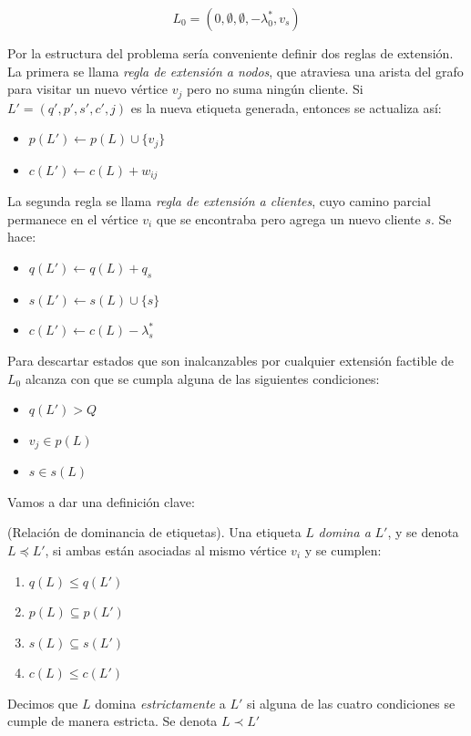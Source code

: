 \begin{equation}
    L_0 = (0, \emptyset, \emptyset, -\lambda^{*}_0, v_s)
\end{equation}

Por la estructura del problema sería conveniente definir dos reglas de extensión. La primera se llama \emph{regla de extensión a nodos}, que atraviesa una arista del grafo para visitar un nuevo vértice $v_j$ pero no suma ningún cliente. Si $L' = (q', p', s', c', j)$ es la nueva etiqueta generada, entonces se actualiza así:

\begin{itemize}
    \item $p(L') \gets p(L) \cup \{v_j\}$
    \item $c(L') \gets c(L) + w_{ij}$
\end{itemize}

La segunda regla se llama \emph{regla de extensión a clientes}, cuyo camino parcial permanece en el vértice $v_i$ que se encontraba pero agrega un nuevo cliente $s$. Se hace:

\begin{itemize}
    \item $q(L') \gets q(L) + q_ s$
    \item $s(L') \gets s(L) \cup \{s\}$
    \item $c(L') \gets c(L) - \lambda^{*}_s$
\end{itemize}

Para descartar estados que son inalcanzables por cualquier extensión factible de $L_0$ alcanza con que se cumpla alguna de las siguientes condiciones:

\begin{itemize}
    \item $q(L') > Q$
    \item $v_j \in p(L)$
    \item $s \in s(L)$
\end{itemize}

Vamos a dar una definición clave:

\begin{definition}
\label{def:domination}
    (Relación de dominancia de etiquetas).
    Una etiqueta $L$ \emph{domina a} $L'$, y se denota $L \preceq L'$, si ambas están asociadas al mismo vértice $v_i$ y se cumplen:
    \begin{enumerate}
        \item $q(L) \leq q(L')$
        \item $p(L) \subseteq p(L')$
        \item $s(L) \subseteq s(L')$
        \item $c(L) \leq c(L')$
    \end{enumerate}

Decimos que $L$ domina \emph{estrictamente} a $L'$ si alguna de las cuatro condiciones se cumple de manera estricta. Se denota $L \prec L'$
\end{definition}

